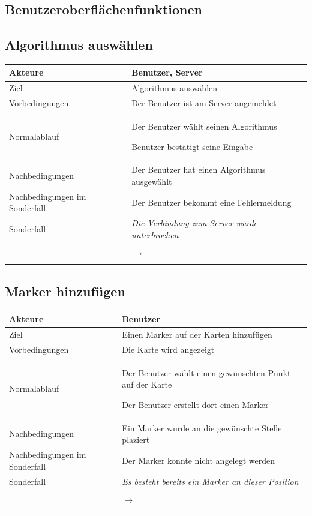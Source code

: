 \documentclass[a4paper,10pt,titlepage]{article}
\makeatletter
\newcommand\novspace{\@minipagetrue}
\newenvironment{owncompactitem}{%
\compactitem
}{%
\@finalstrut\@arstrutbox
\@nameuse{endcompactitem}%
\aftergroup\let\aftergroup\@finalstrut\aftergroup\@gobble
}
\newenvironment{owncompactenum}{%
\compactenum
}{%
\@finalstrut\@arstrutbox
\@nameuse{endcompactenum}%
\aftergroup\let\aftergroup\@finalstrut\aftergroup\@gobble
}
\newcommand{\usecase}[7]
{\subsection{#1}
\setlength{\extrarowheight}{2pt}
\begin{tabular}{|p{0.2\textwidth}|p{0.9\textwidth}|}
\hline
  Akteure & #2\\\hline
  Ziel & #3\\\hline
  Vorbedingungen & \novspace
  	\begin{owncompactitem}[-] #4 \end{owncompactitem} \\\hline
  Normalablauf & \vspace{-7pt}
  	\begin{owncompactenum}[1.] #6 \end{owncompactenum} \\\hline
  Nachbedingungen & \novspace
  	\begin{owncompactitem}[-] #5 \end{owncompactitem} \\\hline
  #7
\end{tabular}
}
\newcommand{\sonderfall}[4][\empty]
{
Sonderfall #2 & \vspace{-10pt}
	\textit{#3}
	\begin{owncompactenum}[{#2}.1] {#4} \end{owncompactenum}
  	\ifthenelse{\equal{#1}{\empty}}
    	{\\\hline} %
    	{\ensuremath{\rightarrow} #1 \\ [+1pt] \hline} %

}
\newcommand{\kurzersonderfall}[3][\empty]
{
Sonderfall #2 & \vspace{-10pt}
	\textit{#3}
  	\ifthenelse{\equal{#1}{\empty}}
    	{\\\hline} %
    	{\\&\ensuremath{\rightarrow} #1 \\ [+1pt] \hline} %

}
\newcommand{\sondernachbedingung}[1]
{
Nachbedingungen im Sonderfall& \novspace
	\begin{owncompactitem}[-]
		#1
	\end{owncompactitem} \\\hline
}
\makeatother
\begin{document}


{%
}{%
}{%
}{%
}{%
}

{%
}{%
}

{%
}

\subsection*{Benutzeroberflächenfunktionen}
\usecase{Algorithmus auswählen}{Benutzer, Server}%
{%
Algorithmus auswählen
}{%
	\item Der Benutzer ist am Server angemeldet
}{%
	\item  Der Benutzer hat einen Algorithmus ausgewählt
}{%
	\item Der Benutzer wählt seinen Algorithmus
	\item Benutzer bestätigt seine Eingabe
}{%
\sondernachbedingung{\item Der Benutzer bekommt eine Fehlermeldung}
\kurzersonderfall[]{}%
	{%
	Die Verbindung zum Server wurde unterbrochen
	}
}

\usecase{Marker hinzufügen}{Benutzer}%
{%
Einen Marker auf der Karten hinzufügen
}{%
	\item Die Karte wird angezeigt
}{%
	\item Ein Marker wurde an die gewünschte Stelle plaziert
}{%
	\item Der Benutzer wählt einen gewünschten Punkt auf der Karte
	\item Der Benutzer erstellt dort einen Marker
}{%
\sondernachbedingung{
	\item Der Marker konnte nicht angelegt werden
	}
\kurzersonderfall[]{}%
	{%
	Es besteht bereits ein Marker an dieser Position
	}
}
\end{document}
